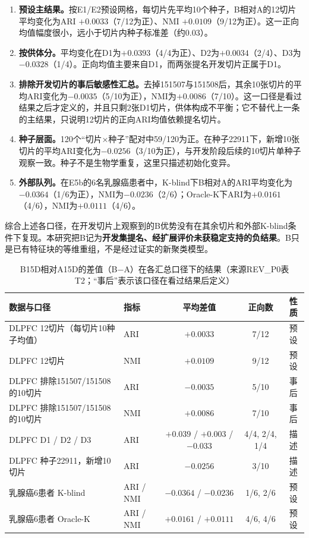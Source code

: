 \begin{enumerate}
  \item \textbf{预设主结果。}按E1/E2预设网格，每切片先平均10个种子，B相对A的12切片平均变化为ARI $+0.0033$（7/12为正）、NMI $+0.0109$（9/12为正）。这一正向均值幅度很小，远小于切片内种子标准差（约0.03）。
  \item \textbf{按供体分。}平均变化在D1为$+0.0393$（4/4为正）、D2为$+0.0034$（2/4）、D3为$-0.0328$（1/4）。正向均值主要来自D1，而两张提名开发切片正属于D1。
  \item \textbf{排除开发切片的事后敏感性汇总。}去掉151507与151508后，其余10张切片的平均ARI变化为$-0.0035$（5/10为正），NMI为$+0.0086$（7/10）。这一口径是看过结果之后才定义的，并且只剩2张D1切片，供体构成不平衡；它不替代上一条的主结果，只说明12切片的正向ARI均值依赖提名切片。
  \item \textbf{种子层面。}120个“切片×种子”配对中59/120为正。在种子22911下，新增10张切片的平均ARI变化为$-0.0256$（3/10为正），与开发阶段后续的10切片单种子观察一致。种子不是生物学重复，这里只描述初始化变异。
  \item \textbf{外部队列。}在E5b的6名乳腺癌患者中，K-blind下B相对A的ARI平均变化为$-0.0364$（1/6为正），NMI为$-0.0236$（2/6）；Oracle-K下ARI为$+0.0161$（4/6），NMI为$+0.0111$（4/6）。
\end{enumerate}

综合上述各口径，在开发切片上观察到的B优势没有在其余切片和外部K-blind条件下复现。本研究把B记为\textbf{开发集提名、经扩展评价未获稳定支持的负结果}。B只是已有特征块的等维重组，不是经过证实的新聚类模型。

\begin{table}[htbp]
\centering
\caption{B15D相对A15D的差值（B$-$A）在各汇总口径下的结果（来源REV\_P0表T2；“事后”表示该口径在看过结果后定义）}
\label{tab:cc-b-minus-a-rev-p0}
\small
\begin{tabular}{llccc}
\toprule
数据与口径 & 指标 & 平均差值 & 正向数 & 性质\\
\midrule
DLPFC 12切片（每切片10种子均值） & ARI & $+0.0033$ & 7/12 & 预设\\
DLPFC 12切片 & NMI & $+0.0109$ & 9/12 & 预设\\
DLPFC 排除151507/151508的10切片 & ARI & $-0.0035$ & 5/10 & 事后\\
DLPFC 排除151507/151508的10切片 & NMI & $+0.0086$ & 7/10 & 事后\\
DLPFC D1 / D2 / D3 & ARI & $+0.039$ / $+0.003$ / $-0.033$ & 4/4, 2/4, 1/4 & 描述\\
DLPFC 种子22911，新增10切片 & ARI & $-0.0256$ & 3/10 & 描述\\
乳腺癌6患者 K-blind & ARI / NMI & $-0.0364$ / $-0.0236$ & 1/6, 2/6 & 预设\\
乳腺癌6患者 Oracle-K & ARI / NMI & $+0.0161$ / $+0.0111$ & 4/6, 4/6 & 预设\\
\bottomrule
\end{tabular}
\end{table}

